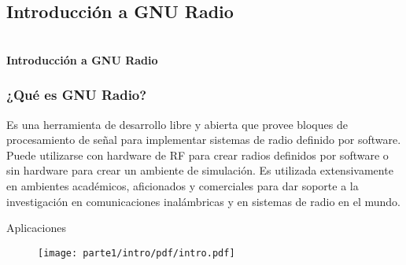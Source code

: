\subsection{Introducción a GNU Radio}

\begin{frame}{}


\bfseries{\textrm{\Large \\Introducción a GNU Radio}}
\raggedright
\end{frame}



\begin{frame}
  
  
  \frametitle{¿Qué es GNU Radio?}

  
Es una herramienta de desarrollo libre y abierta que provee bloques de
	procesamiento de señal para implementar sistemas de radio definido por
	software. Puede utilizarse con hardware de RF para crear radios
	definidos por software o sin hardware para crear un ambiente de
	simulación. Es utilizada extensivamente en ambientes académicos,
aficionados y comerciales para dar soporte a la investigación en comunicaciones
inalámbricas y en sistemas de radio en el mundo.  

\end{frame}



\begin{frame}{Aplicaciones}
  \begin{figure}[H]
  \centering
  \texttt{[image: parte1/intro/pdf/intro.pdf]}
  \end{figure}
  
  
\end{frame}



